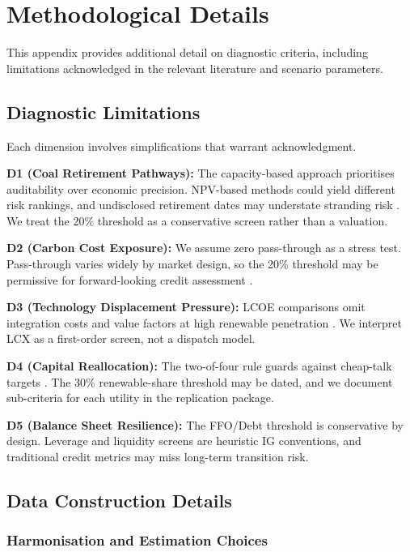 \documentclass[review,3p,authoryear]{elsarticle}
\begin{document}
\section{Methodological Details}
\label{app:methods}

This appendix provides additional detail on diagnostic criteria, including limitations acknowledged in the relevant literature and scenario parameters.

\subsection{Diagnostic Limitations}

Each dimension involves simplifications that warrant acknowledgment.

\textbf{D1 (Coal Retirement Pathways):} The capacity-based approach prioritises auditability over economic precision. NPV-based methods could yield different risk rankings, and undisclosed retirement dates may understate stranding risk \citep{CarbonTracker2018}. We treat the 20\% threshold as a conservative screen rather than a valuation.

\textbf{D2 (Carbon Cost Exposure):} We assume zero pass-through as a stress test. Pass-through varies widely by market design, so the 20\% threshold may be permissive for forward-looking credit assessment \citep{Sijm2006}.

\textbf{D3 (Technology Displacement Pressure):} LCOE comparisons omit integration costs and value factors at high renewable penetration \citep{Hirth2015,Hirth2013,IEATechno2024}. We interpret LCX as a first-order screen, not a dispatch model.

\textbf{D4 (Capital Reallocation):} The two-of-four rule guards against cheap-talk targets \citep{Rogelj2023}. The 30\% renewable-share threshold may be dated, and we document sub-criteria for each utility in the replication package.

\textbf{D5 (Balance Sheet Resilience):} The FFO/Debt threshold is conservative by design. Leverage and liquidity screens are heuristic IG conventions, and traditional credit metrics may miss long-term transition risk.

\subsection{Data Construction Details}
\label{app:data_considerations}

\subsubsection*{Harmonisation and Estimation Choices}
\end{document}
